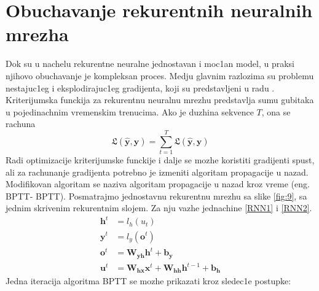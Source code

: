 \documentclass[a4paper, openany, oneside, 11pt]{book}
\begin{document}
\section{Obuchavanje rekurentnih neuralnih mrezha}
Dok su u nachelu rekurentne neuralne jednostavan i moc1an model, u praksi njihovo obuchavanje je kompleksan proces. Medju glavnim razlozima su problemu nestajuc1eg i eksplodirajuc1eg gradijenta, koji su predstavljeni u radu \cite{Bengio}. Kriterijumska funckija za rekurentnu neuralnu mrezhu predstavlja sumu gubitaka u pojedinachnim vremenskim trenucima. Ako je duzhina sekvence $T$, ona se rachuna 
\begin{equation}
\mathfrak{L}(\mathbf{\hat{y}},\mathbf{y}) = \sum^{T}_{t=1}\mathfrak{L}(\mathbf{\hat{y}},\mathbf{y})
\end{equation}
Radi optimizacije kriterijumske funckije i dalje se mozhe koristiti gradijenti spust, ali za rachunanje gradijenta potrebno je izmeniti algoritam propagacije u nazad. Modifikovan algoritam se naziva algoritam propagacije u nazad kroz vreme \cite{BPTT} (eng. \acrlong{BPTT}- \acrshort{BPTT}). Posmatrajmo jednostavnu rekurentnu mrezhu sa slike \ref{fig:9}, sa jednim skrivenim rekurentnim slojem. Za nju vazhe jednachine \ref{RNN1} i \ref{RNN2}.
\begin{align}
\mathbf{h}^t &= l_h(u_t)\\
\mathbf{y}^t &= l_y(\mathbf{o}^t)\\
\mathbf{o}^t &= \mathbf{W_{yh}}\mathbf{h}^t+\mathbf{b_y}\\
\mathbf{u}^t &= \mathbf{W_{hx}}\mathbf{x}^t+\mathbf{W_{hh}}\mathbf{h}^{t-1}+\mathbf{b_h} 
\end{align}
Jedna iteracija algoritma \acrshort{BPTT} se mozhe prikazati kroz sledec1e postupke:
\renewcommand{\labelenumii}{\arabic{enumii}.}
\end{document}
